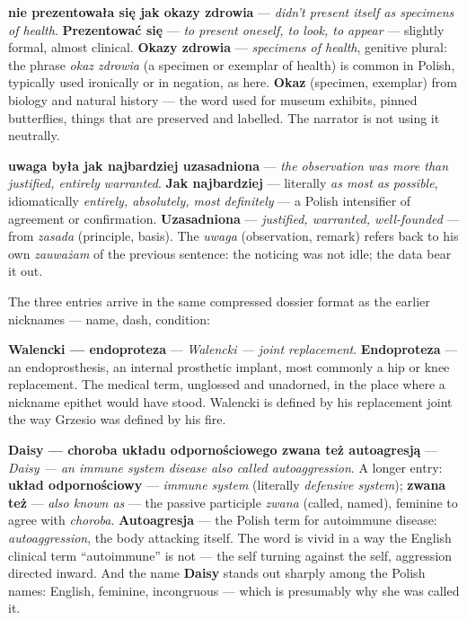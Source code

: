 \textbf{nie prezentowała się jak okazy zdrowia} ---
\textit{didn't present itself as specimens of health}.
\textbf{Prezentować się} --- \textit{to present oneself,
to look, to appear} --- slightly formal, almost clinical.
\textbf{Okazy zdrowia} --- \textit{specimens of health},
genitive plural: the phrase \textit{okaz zdrowia} (a
specimen or exemplar of health) is common in Polish,
typically used ironically or in negation, as here.
\textbf{Okaz} (specimen, exemplar) from biology and
natural history --- the word used for museum exhibits,
pinned butterflies, things that are preserved and
labelled. The narrator is not using it neutrally.

\textbf{uwaga była jak najbardziej uzasadniona} ---
\textit{the observation was more than justified, entirely
warranted}. \textbf{Jak najbardziej} --- literally
\textit{as most as possible}, idiomatically \textit{entirely,
absolutely, most definitely} --- a Polish intensifier of
agreement or confirmation. \textbf{Uzasadniona} ---
\textit{justified, warranted, well-founded} --- from
\textit{zasada} (principle, basis). The \textit{uwaga}
(observation, remark) refers back to his own
\textit{zauważam} of the previous sentence: the noticing
was not idle; the data bear it out.

\medskip

The three entries arrive in the same compressed dossier
format as the earlier nicknames --- name, dash, condition:

\textbf{Walencki --- endoproteza} --- \textit{Walencki
--- joint replacement}. \textbf{Endoproteza} ---
an endoprosthesis, an internal prosthetic implant,
most commonly a hip or knee replacement. The medical
term, unglossed and unadorned, in the place where a
nickname epithet would have stood. Walencki is defined
by his replacement joint the way Grzesio was defined
by his fire.

\textbf{Daisy --- choroba układu odpornościowego zwana
też autoagresją} --- \textit{Daisy --- an immune system
disease also called autoaggression}. A longer entry:
\textbf{układ odpornościowy} --- \textit{immune system}
(literally \textit{defensive system}); \textbf{zwana też}
--- \textit{also known as} --- the passive participle
\textit{zwana} (called, named), feminine to agree with
\textit{choroba}. \textbf{Autoagresja} --- the Polish
term for autoimmune disease: \textit{autoaggression},
the body attacking itself. The word is vivid in a way
the English clinical term ``autoimmune'' is not ---
the self turning against the self, aggression directed
inward. And the name \textbf{Daisy} stands out sharply
among the Polish names: English, feminine, incongruous
--- which is presumably why she was called it.

